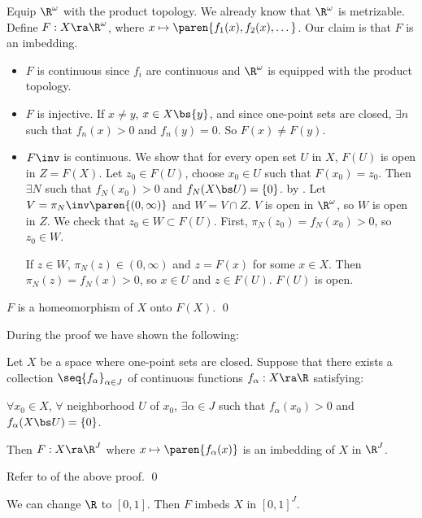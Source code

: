  Equip \(\R^\omega\) with the product topology. We already know that \(\R^\omega\) is metrizable. Define \(F : X \ra \R^\omega\), where \(x \mapsto \paren{f_1(x), f_2(x), \dots}\). Our claim is that \(F\) is an imbedding.
\begin{itemize}
    \item \(F\) is continuous since \(f_i\) are continuous and \(\R^\omega\) is equipped with the product topology.

    \item \(F\) is injective. If \(x \neq y\), \(x \in X \bs \{y\}\), and since one-point sets are closed, \(\exists n\) such that \(f_n(x) > 0\) and \(f_n(y) = 0\). So \(F(x) \neq F(y)\).

    \item \(F\inv\) is continuous. We show that for every open set \(U\) in \(X\), \(F(U)\) is open in \(Z = F(X)\). Let \(z_0 \in F(U)\), choose \(x_0 \in U\) such that \(F(x_0) = z_0\). Then \(\exists N\) such that \(f_N(x_0) > 0\) and \(f_N(X \bs U) = \{0\}\). by . Let \(V = \pi_N\inv \paren{(0, \infty)}\) and \(W = V \cap Z\). \(V\) is open in \(\R^\omega\), so \(W\) is open in \(Z\). We check that \(z_0 \in W \subset F(U)\). First, \(\pi_N(z_0) = f_N(x_0) > 0\), so \(z_0 \in W\).

    If \(z \in W\), \(\pi_N(z) \in (0, \infty)\) and \(z = F(x)\) for some \(x \in X\). Then \(\pi_N(z) = f_N(x) > 0\), so \(x \in U\) and \(z \in F(U)\). \(F(U)\) is open.
\end{itemize}
\(F\) is a homeomorphism of \(X\) onto \(F(X)\). \qed

During the proof we have shown the following:

  Let \(X\) be a space where one-point sets are closed. Suppose that there exists a collection \(\seq{f_\alpha}_{\alpha \in J}\) of continuous functions \(f_\alpha : X \ra \R\) satisfying:
\begin{center}
    \(\forall x_0 \in X\), \(\forall\) neighborhood \(U\) of \(x_0\), \(\exists \alpha \in J\) such that \(f_\alpha(x_0) > 0\) and \(f_\alpha(X \bs U) = \{0\}\).
\end{center}
Then \(F : X \ra \R^J\) where \(x \mapsto \paren{f_\alpha(x)}\) is an imbedding of \(X\) in \(\R^J\).

\pf Refer to  of the above proof. \qed

\rmk We can change \(\R\) to \([0, 1]\). Then \(F\) imbeds \(X\) in \([0, 1]^J\).

